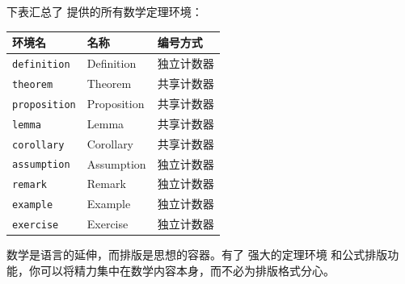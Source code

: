 \begin{kaobox}[title=定理环境速查表]
下表汇总了  提供的所有数学定理环境：
\begin{center}
\begin{tabular}{l l l}
    \toprule
    环境名 & 名称 & 编号方式 \\
    \midrule
    \texttt{definition}  & Definition  & 独立计数器 \\
    \texttt{theorem}     & Theorem     & 共享计数器 \\
    \texttt{proposition} & Proposition & 共享计数器 \\
    \texttt{lemma}       & Lemma       & 共享计数器 \\
    \texttt{corollary}   & Corollary   & 共享计数器 \\
    \texttt{assumption}  & Assumption  & 独立计数器 \\
    \texttt{remark}      & Remark      & 独立计数器 \\
    \texttt{example}     & Example     & 独立计数器 \\
    \texttt{exercise}    & Exercise    & 独立计数器 \\
    \bottomrule
\end{tabular}
\end{center}
\end{kaobox}


数学是语言的延伸，而排版是思想的容器。有了  强大的定理环境
和公式排版功能，你可以将精力集中在数学内容本身，而不必为排版格式分心。

\endinput
